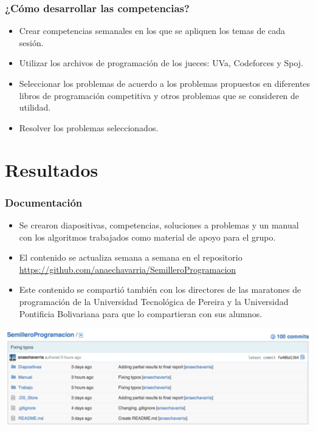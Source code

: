 \documentclass{beamer}
\begin{document}
	\begin{frame}
		\frametitle{¿Cómo desarrollar las competencias?}
		\begin{itemize}
			\item Crear competencias semanales en los que se apliquen los temas de cada sesión.
			\item Utilizar los archivos de programación de los jueces: UVa, Codeforces y Spoj.
			\item Seleccionar los problemas de acuerdo a los problemas propuestos en diferentes libros de programación competitiva y otros problemas que se consideren de utilidad.
			\item Resolver los problemas seleccionados.
		\end{itemize}
	\end{frame}
	
\section{Resultados}
	\begin{frame}
		\frametitle{Documentación}
		\begin{itemize}
			\item Se crearon diapositivas, competencias, soluciones a problemas y un manual con los algoritmos trabajados como material de apoyo para el grupo.
			\item El contenido se actualiza semana a semana en el repositorio \url{https://github.com/anaechavarria/SemilleroProgramacion}
			\item Este contenido se compartió también con los directores de las maratones de programación de la Universidad Tecnológica de Pereira y la Universidad Pontificia Bolivariana para que lo compartieran con sus alumnos.
		\end{itemize}
	\end{frame}
	
	\begin{frame}
		\includegraphics[width = \textwidth]{./img/git1.png}
	\end{frame}
	
\end{document}
